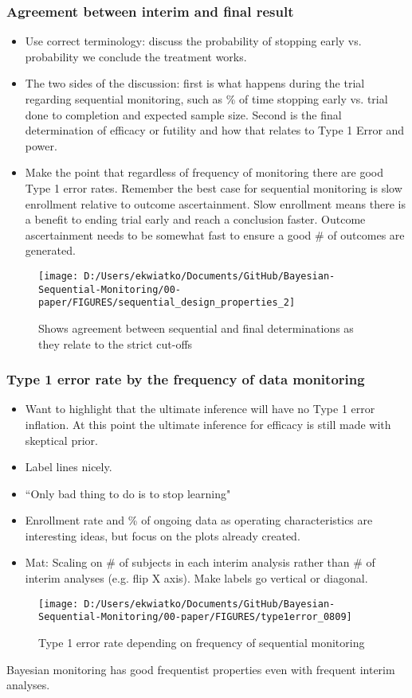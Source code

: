 \documentclass[12pt]{article}
\begin{document}
\subsubsection{Agreement between interim and final result}
\begin{itemize}
\item Use correct terminology: discuss the probability of stopping early vs. probability we conclude the treatment works.
\item The two sides of the discussion: first is what happens during the trial regarding sequential monitoring, such as \% of time stopping early vs. trial done to completion and expected sample size. Second is the final determination of efficacy or futility and how that relates to Type 1 Error and power. 
\item Make the point that regardless of frequency of monitoring there are good Type 1 error rates. Remember the best case for sequential monitoring is slow enrollment relative to outcome ascertainment. Slow enrollment means there is a benefit to ending trial early and reach a conclusion faster. Outcome ascertainment needs to be somewhat fast to ensure a good \# of outcomes are generated.
\end{itemize}
\begin{figure}
\texttt{[image: D:/Users/ekwiatko/Documents/GitHub/Bayesian-Sequential-Monitoring/00-paper/FIGURES/sequential\_design\_properties\_2]}
\caption{Shows agreement between sequential and final determinations as they relate to the strict cut-offs}
\end{figure}
\newpage
\subsubsection{Type 1 error rate by the frequency of data monitoring}
\begin{itemize}
\item Want to highlight that the ultimate inference will have no Type 1 error inflation. At this point the ultimate inference for efficacy is still made with skeptical prior.
\item Label lines nicely.
\item ``Only bad thing to do is to stop learning"
\item Enrollment rate and \% of ongoing data as operating characteristics are interesting ideas, but focus on the plots already created.
\item Mat: Scaling on \# of subjects in each interim analysis rather than \# of interim analyses (e.g. flip X axis). Make labels go vertical or diagonal.
\end{itemize}
\begin{figure}
\texttt{[image: D:/Users/ekwiatko/Documents/GitHub/Bayesian-Sequential-Monitoring/00-paper/FIGURES/type1error\_0809]}
\caption{Type 1 error rate depending on frequency of sequential monitoring}
\end{figure}
Bayesian monitoring has good frequentist properties even with frequent interim analyses.
\newpage
\end{document}
